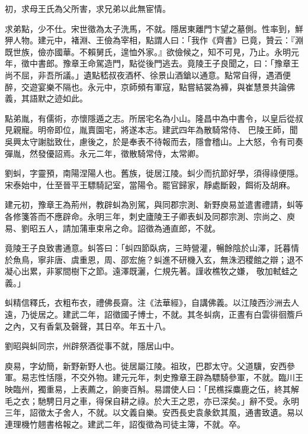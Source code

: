\begin{pinyinscope}
 初，求母王氏為父所害，求兄弟以此無宦情。



 求弟點，少不仕。宋世徵為太子洗馬，不就。隱居東離門卞望之墓側。性率到，鮮狎人物。建元中，褚淵、王儉為宰相，點謂人曰：「我作《齊書》已竟，贊云：『淵既世族，儉亦國華。不賴舅氏，遑恤外家。』欲儉候之，知不可見，乃止。永明元年，徵中書郎。豫章王命駕造門，點從後門逃去。竟陵王子良聞之，曰：「豫章王尚不屈，非吾所議。」遺點嵇叔夜酒杯、徐景山酒鎗以通意。點常自得，遇酒便醉，交遊宴樂不隔也。永元中，京師頻有軍寇，點嘗結裳為褲，與崔慧景共論佛義，其語默之迹如此。



 點弟胤，有儒術，亦懷隱遁之志。所居宅名為小山。隆昌中為中書令，以皇后從叔見親寵。明帝即位，胤賣園宅，將遂本志。建武四年為散騎常侍、
 巴陵王師，聞吳興太守謝朏致仕，慮後之，於是奉表不待報而去，隱會稽山。上大怒，令有司奏彈胤，然發優詔焉。永元二年，徵散騎常侍，太常卿。



 劉虯，字靈預，南陽涅陽人也。舊族，徙居江陵。虯少而抗節好學，須得祿便隱。宋泰始中，仕至晉平王驃騎記室，當陽令。罷官歸家，靜處斷穀，餌術及胡麻。



 建元初，豫章王為荊州，教辟虯為別駕，與同郡宗測、新野庾易並遣書禮請，虯等各修箋答而不應辟命。永明三年，刺史廬陵王子卿表虯及同郡宗測、宗尚之、庾易、劉昭五人，請加蒲車束帛之命。詔徵為通直郎，不就。



 竟陵王子良致書通意。虯答曰：「虯四節臥病，三時營灌，暢餘陰於山澤，託暮情於魚鳥，寧非唐、虞重恩，周、邵宏施？虯進不研機入玄，無洙泗稷館之辯；退不凝心出累，非冢間樹下之節。遠澤既灑，仁規先著。謹收樵牧之嫌，
 敬加軾蛙之義。」



 虯精信釋氏，衣粗布衣，禮佛長齋。注《法華經》，自講佛義。以江陵西沙洲去人遠，乃徙居之。建武二年，詔徵國子博士，不就。其冬虯病，正晝有白雲徘徊簷戶之內，又有香氣及磬聲，其日卒。年五十八。



 劉昭與虯同宗，州辟祭酒從事不就，隱居山中。



 庾易，字幼簡，新野新野人也。徙居屬江陵。祖玫，巴郡太守。父道驥，安西參軍。易志性恬隱，不交外物。建元元年，刺史豫章王辟為驃騎參軍，不就。臨川王映臨州，獨重易，上表薦之，餉麥百斛。易謂使人曰：「民樵採麋鹿之伍，終其解毛之衣；馳騁日月之車，得保自耕之祿。於大王之恩，亦已深矣。」辭不受。永明三年，詔徵太子舍人，不就。以文義自樂。安西長史袁彖欽其風，通書致遺。易以連理機竹翹書格報之。建武二年，詔復徵為司徒主簿，不就。卒。




\end{pinyinscope}
